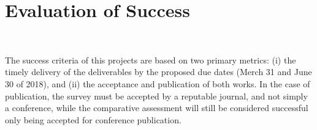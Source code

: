 \documentclass[12pt]{article}
\begin{document}
\section{Evaluation of Success}\

The success criteria of this projects are based on two primary metrics: (i) the timely delivery of the deliverables by the proposed due dates (Merch 31 and June 30 of 2018), and (ii) the acceptance and publication of both works. In the case of publication, the survey must be accepted by a reputable journal, and not simply a conference, while the comparative assessment will still be considered successful only being accepted for conference publication.
\end{document}
